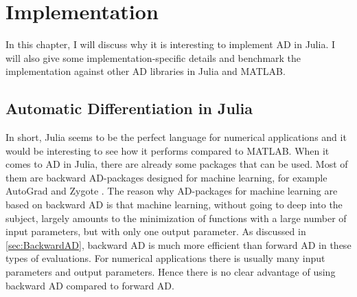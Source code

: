 \chapter{Implementation}
In this chapter, I will discuss why it is interesting to implement AD in Julia. I will also give some implementation-specific details and benchmark the implementation against other AD libraries in Julia and MATLAB.
\label{ch:Implementation}
\section{Automatic Differentiation in Julia}
\label{sec:AD in Julia}
In short, Julia seems to be the perfect language for numerical applications and it would be interesting to see how it performs compared to MATLAB.
When it comes to AD in Julia, there are already some packages that can be used. Most of them are backward AD-packages designed for machine learning, for example AutoGrad \citep{knet2016mlsys} and Zygote \citep{innes2018don}. The reason why AD-packages for machine learning are based on backward AD is that machine learning, without going to deep into the subject, largely amounts to the minimization of functions with a large number of input parameters, but with only one output parameter. As discussed in \autoref{sec:BackwardAD}, backward AD is much more efficient than forward AD in these types of evaluations. For numerical applications there is usually many input parameters and output parameters. Hence there is no clear advantage of using backward AD compared to forward AD. 

